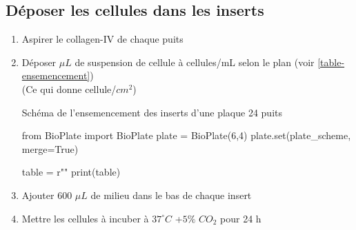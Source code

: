 \subsection{Déposer les cellules dans les inserts}

\begin{enumerate}
\item Aspirer le collagen-IV de chaque puits
\item Déposer  $\mu L$ de suspension de cellule à  cellules/mL selon le plan (voir \ref{table-ensemencement}) \\ (Ce qui donne  cellule/$cm^2$)

\begin{table}[h]
\caption{Schéma de l'ensemencement des inserts d'une plaque 24 puits}
\begin{pycode}

from BioPlate import BioPlate
plate = BioPlate(6,4)
plate.set(plate_scheme, merge=True)

table = r""
print(table)
\end{pycode}
\label{table-ensemencement}
\end{table}
\item Ajouter 600 $\mu L$ de milieu dans le bas de chaque insert
\item Mettre les cellules à incuber à $37^\circ C$ +$5\%$ $CO_2$ pour 24 h

\end{enumerate}